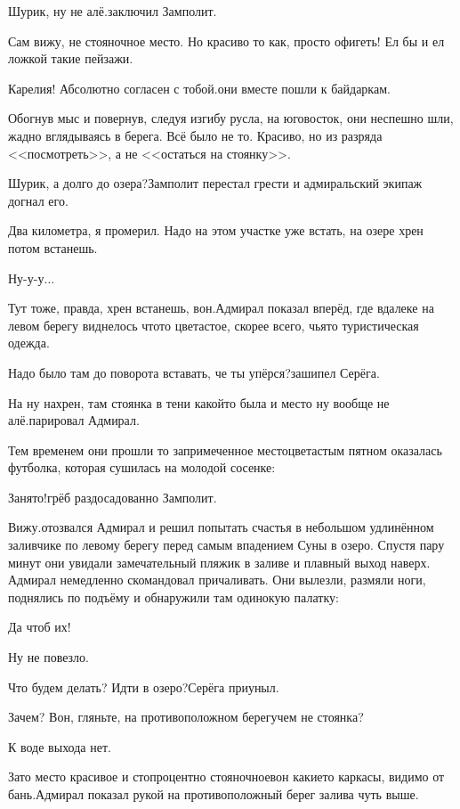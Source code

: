 \diagdash Шурик, ну не алё.\mdash заключил Замполит.

\diagdash Сам вижу, не стояночное место. Но красиво то как, просто офигеть! Ел бы и ел ложкой такие пейзажи.

\diagdash Карелия! Абсолютно согласен с тобой.\mdash они вместе пошли к байдаркам.

Обогнув мыс и повернув, следуя изгибу русла, на юго\sdash восток, они неспешно шли, жадно вглядываясь в берега. Всё было не то. Красиво, но из разряда <<посмотреть>>, а не <<остаться на стоянку>>.

\diagdash Шурик, а долго до озера?\mdash Замполит перестал грести и адмиральский экипаж догнал его.

\diagdash Два километра, я промерил. Надо на этом участке уже встать, на озере хрен потом встанешь.

\diagdash Ну-у-у$\ldots$

\diagdash Тут тоже, правда, хрен встанешь, вон.\mdash Адмирал показал вперёд, где вдалеке на левом берегу виднелось что\sdash то цветастое, скорее всего, чья\sdash то туристическая одежда. 

\diagdash Надо было там до поворота вставать, че ты упёрся?\mdash зашипел Серёга.

\diagdash На ну нахрен, там стоянка в тени какой\sdash то была и место ну вообще не алё.\mdash парировал Адмирал.

Тем временем они прошли то запримеченное место\mdash цветастым пятном оказалась футболка, которая сушилась на молодой сосенке:

\diagdash Занято!\mdash грёб раздосадованно Замполит.

\diagdash Вижу.\mdash отозвался Адмирал и решил попытать счастья в небольшом удлинённом заливчике по левому берегу перед самым впадением Суны в озеро. Спустя пару минут они увидали замечательный пляжик в заливе и плавный выход наверх. Адмирал немедленно скомандовал причаливать. Они вылезли, размяли ноги, поднялись по подъёму и обнаружили там одинокую палатку:

\diagdash Да чтоб их!

\diagdash Ну не повезло.

\diagdash Что будем делать? Идти в озеро?\mdash Серёга приуныл.

\diagdash Зачем? Вон, гляньте, на противоположном берегу\mdash чем не стоянка? 

\diagdash К воде выхода нет.

\diagdash Зато место красивое и стопроцентно стояночное\mdash вон какие\sdash то каркасы, видимо от бань.\mdash Адмирал показал рукой на противоположный берег залива чуть выше.


